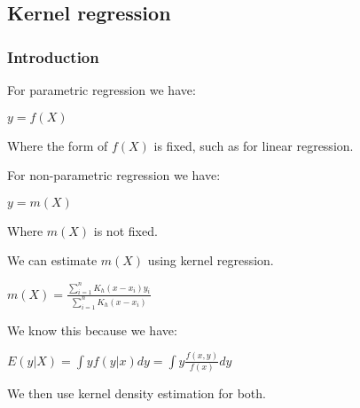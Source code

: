 
\subsection{Kernel regression}

\subsubsection{Introduction}

For parametric regression we have:

\(y=f(X)\)

Where the form of \(f(X)\) is fixed, such as for linear regression.

For non-parametric regression we have:

\(y=m(X)\)

Where \(m(X)\) is not fixed.

We can estimate \(m(X)\) using kernel regression.

\(m(X)=\frac{\sum_{i=1}^nK_h(x-x_i)y_i}{\sum_{i=1}^nK_h(x-x_i)}\)

We know this because we have:

\(E(y|X)=\int yf(y|x)dy=\int y\frac{f(x,y)}{f(x)}dy\)

We then use kernel density estimation for both.

